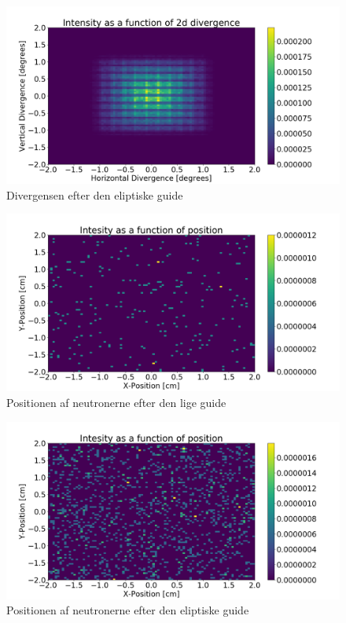 \documentclass[12pt,oneside,a4paper]{article}
\begin{document}
{{{{{\begin{figure}[H]
\centering
\includegraphics[width=1\textwidth]{div_ellipse_after.png}
\caption{Divergensen efter den eliptiske guide} \label{ap:div_ellipse_after}
\end{figure}


\begin{figure}[H]
\centering
\includegraphics[width=1\textwidth]{psd_straight_after.png}
\caption{Positionen af neutronerne efter den lige guide}
\end{figure}

\begin{figure}[H]
\centering
\includegraphics[width=1\textwidth]{psd_ellipse_after.png}
\caption{Positionen af neutronerne efter den eliptiske guide}
\end{figure}



}}}}}
\end{document}
